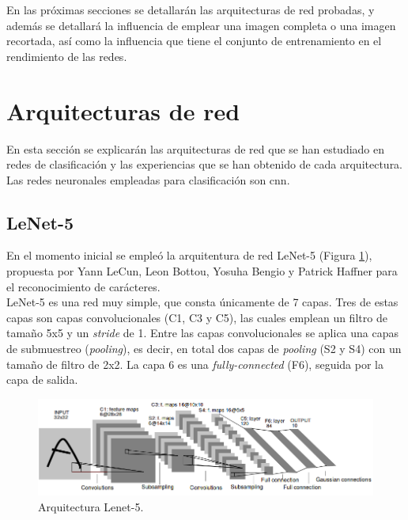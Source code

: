 En las próximas secciones se detallarán las arquitecturas de red probadas, y además se detallará la influencia de emplear una imagen completa o una imagen recortada, así como la influencia que tiene el conjunto de entrenamiento en el rendimiento de las redes.


\section{Arquitecturas de red}

En esta sección se explicarán las arquitecturas de red que se han estudiado en redes de clasificación y las experiencias que se han obtenido de cada arquitectura. Las redes neuronales empleadas para clasificación son \acrshort{cnn}.

\subsection{LeNet-5}

En el momento inicial se empleó la arquitentura de red LeNet-5 \cite{LeCunGradient} (Figura \ref{fig.Lenet}), propuesta por Yann LeCun, Leon Bottou, Yosuha Bengio y Patrick Haffner para el reconocimiento de carácteres.\\

LeNet-5 es una red muy simple, que consta únicamente de 7 capas. Tres de estas capas son capas convolucionales (C1, C3 y C5), las cuales emplean un filtro de tamaño 5x5 y un \textit{stride} de 1. Entre las capas convolucionales se aplica una capas de submuestreo (\textit{pooling}), es decir, en total dos capas de \textit{pooling} (S2 y S4) con un tamaño de filtro de 2x2. La capa 6 es una \textit{fully-connected} (F6), seguida por la capa de salida.\\

\begin{figure}
\begin{center}
	\includegraphics[width=1\textwidth]{figures/Clasificacion/model_lenet.png}
   \caption{Arquitectura Lenet-5.}
	\label{fig.Lenet}
\end{center}
\end{figure}

